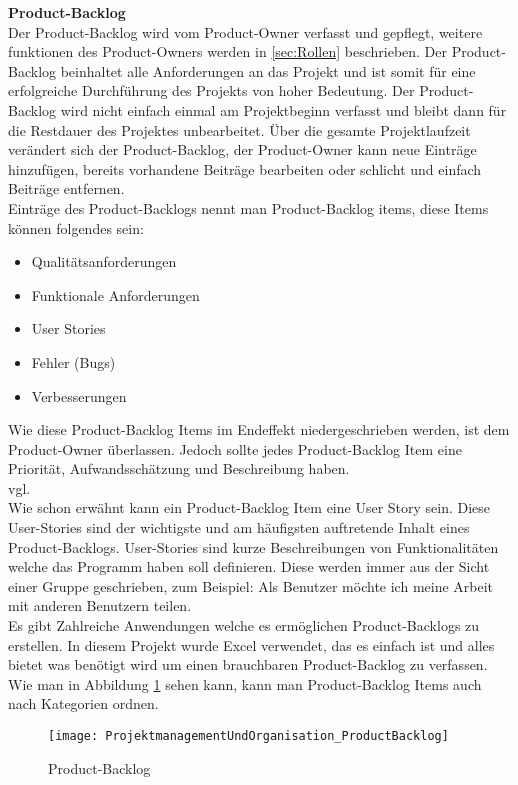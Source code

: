			\textbf{Product-Backlog} \\
				Der Product-Backlog wird vom Product-Owner verfasst und gepflegt, weitere funktionen des Product-Owners werden in \ref{sec:Rollen} beschrieben. Der Product-Backlog beinhaltet alle Anforderungen an das Projekt und ist somit für eine erfolgreiche Durchführung des Projekts von hoher Bedeutung. Der Product-Backlog wird nicht einfach einmal am Projektbeginn verfasst und bleibt dann für die Restdauer des Projektes unbearbeitet. Über die gesamte Projektlaufzeit verändert sich der Product-Backlog, der Product-Owner kann neue Einträge hinzufügen, bereits vorhandene Beiträge bearbeiten oder schlicht und einfach Beiträge entfernen. \\
				Einträge des Product-Backlogs nennt man Product-Backlog items, diese Items können folgendes sein: 
				\begin{itemize}
					\item Qualitätsanforderungen
					\item Funktionale Anforderungen
					\item User Stories
					\item Fehler (Bugs)
					\item Verbesserungen
				\end{itemize}
				Wie diese Product-Backlog Items im Endeffekt niedergeschrieben werden, ist dem Product-Owner überlassen. Jedoch sollte jedes Product-Backlog Item eine Priorität, Aufwandsschätzung und Beschreibung haben.\\ vgl.\textcite{ScrumProduct-Backlog} \\
				Wie schon erwähnt kann ein Product-Backlog Item eine User Story sein. Diese User-Stories sind der wichtigste und am häufigsten auftretende Inhalt eines Product-Backlogs. User-Stories sind kurze Beschreibungen von Funktionalitäten welche das Programm haben soll definieren. Diese werden immer aus der Sicht einer Gruppe geschrieben, zum Beispiel: Als Benutzer möchte ich meine Arbeit mit anderen Benutzern teilen. \\
				Es gibt Zahlreiche Anwendungen welche es ermöglichen Product-Backlogs zu erstellen. In diesem Projekt wurde Excel verwendet, das es einfach ist und alles bietet was benötigt wird um einen brauchbaren Product-Backlog zu verfassen. Wie man in Abbildung \ref{fig:productBacklog} sehen kann, kann man Product-Backlog Items auch nach Kategorien ordnen. \\
\begin{figure}[H]
	\texttt{[image: ProjektmanagementUndOrganisation\_ProductBacklog]}
    \caption{Product-Backlog}
    \label{fig:productBacklog}
\end{figure}
				
